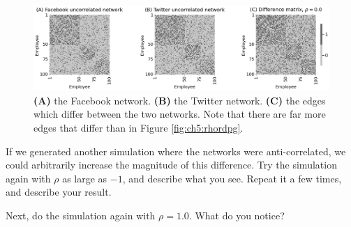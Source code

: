 \begin{figure}[h]
    \centering
    \includegraphics[width=\linewidth]{representations/ch5/Images/norhordpg.png}
    \caption[Uncorrelated RDPGs]{\textbf{(A)} the Facebook network. \textbf{(B)} the Twitter network. \textbf{(C)} the edges which differ between the two networks. Note that there are far more edges that differ than in Figure \ref{fig:ch5:rhordpg}.}
    \label{fig:ch5:norhordpg}
\end{figure}

\begin{floatingbox}[h]\caption{Negative $\rho$-correlated RDPGs}
If we generated another simulation where the networks were anti-correlated, we could arbitrarily increase the magnitude of this difference. Try the simulation again with $\rho$ as large as $-1$, and describe what you see. Repeat it a few times, and describe your result.

Next, do the simulation again with $\rho = 1.0$. What do you notice?
\end{floatingbox}

\newpage